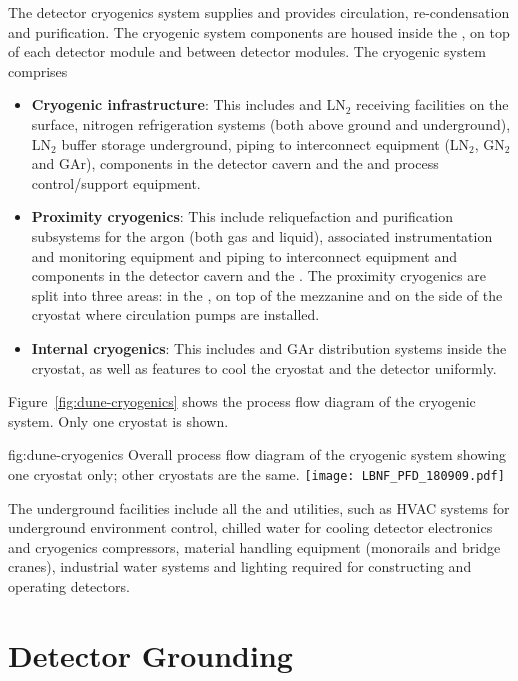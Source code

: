 The detector cryogenics system supplies  and provides
circulation, re-condensation and purification. The cryogenic system
components are housed inside the , on top of each detector module
and between detector modules. The cryogenic system comprises
\begin{itemize}
\item {\bf Cryogenic infrastructure}: This includes  and LN$_2$ receiving
  facilities on the surface, nitrogen refrigeration systems (both
  above ground and underground), LN$_2$ buffer storage
  underground, piping to interconnect equipment (LN$_2$, GN$_2$ and GAr),
  components in the detector cavern and the  and process control/support
  equipment.
\item {\bf Proximity cryogenics}: This include reliquefaction 
  and
  purification subsystems for the argon (both gas and liquid), associated
  instrumentation and monitoring equipment and  piping to
  interconnect equipment and components in the detector cavern and the
  . The proximity cryogenics are split into three areas: in the
  , on top of the mezzanine and on the side of the cryostat 
  where  circulation pumps are installed.
\item {\bf Internal cryogenics}: This includes  and GAr distribution
  systems inside the cryostat, as well as features to cool the
  cryostat and the detector uniformly.
\end{itemize}
Figure~\ref{fig:dune-cryogenics} shows the process flow diagram of the
 cryogenic system. Only one cryostat is shown.
\begin{dunefigure}{fig:dune-cryogenics}
  {Overall process flow diagram of the cryogenic system showing one
    cryostat only; other cryostats are the same.}
  \texttt{[image: LBNF\_PFD\_180909.pdf]}
\end{dunefigure}


The underground facilities include all the  and utilities,
such as HVAC systems for underground environment control, chilled
water for cooling detector electronics and cryogenics compressors,
material handling equipment (monorails and bridge cranes), industrial
water systems and lighting required for constructing and operating
detectors.


\section{Detector Grounding}
\label{sec:fdsp-coord-faci-grounding}


